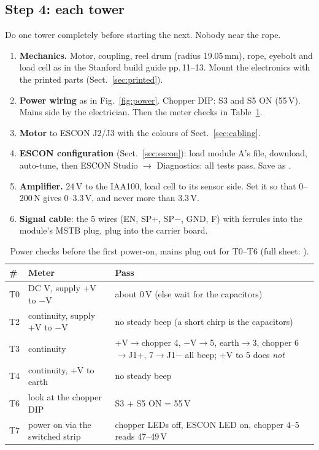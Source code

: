 \subsection{Step 4: each tower}
Do one tower completely before starting the next. Nobody near the rope.
\begin{enumerate}
\item \textbf{Mechanics.} Motor, coupling, reel drum (radius 19.05\,mm), rope, eyebolt and load cell as in the
Stanford build guide pp.\,11--13. Mount the electronics with the printed parts (Sect.~\ref{sec:printed}).
\item \textbf{Power wiring} as in Fig.~\ref{fig:power}. Chopper DIP: S3 and S5 ON (55\,V). Mains side by the
electrician. Then the meter checks in Table~\ref{tab:powerchecks}.
\item \textbf{Motor} to ESCON J2/J3 with the colours of Sect.~\ref{sec:cabling}.
\item \textbf{ESCON configuration} (Sect.~\ref{sec:escon}): load module A's file, download, auto-tune, then
ESCON Studio $\rightarrow$ Diagnostics: all tests pass. Save as .
\item \textbf{Amplifier.} 24\,V to the IAA100, load cell to its sensor side. Set it so that 0--200\,N gives
0--3.3\,V, and never more than 3.3\,V. 
\item \textbf{Signal cable}: the 5 wires (EN, SP+, SP$-$, GND, F) with ferrules into the module's MSTB plug,
plug into the carrier board.
\end{enumerate}

\begin{table}[H]\centering\small
\begin{tabularx}{\linewidth}{llX}
\toprule
\# & Meter & Pass \\
\midrule
T0 & DC V, supply +V to $-$V & about 0\,V (else wait for the capacitors) \\
T2 & continuity, supply +V to $-$V & no steady beep (a short chirp is the capacitors) \\
T3 & continuity & +V$\rightarrow$chopper 4, $-$V$\rightarrow$5, earth$\rightarrow$3, chopper 6$\rightarrow$J1+, 7$\rightarrow$J1$-$ all beep; +V to 5 does \emph{not} \\
T4 & continuity, +V to earth & no steady beep \\
T6 & look at the chopper DIP & S3 + S5 ON = 55\,V \\
T7 & power on via the switched strip & chopper LEDs off, ESCON LED on, chopper 4--5 reads 47--49\,V \\
\bottomrule
\end{tabularx}
\caption{Power checks before the first power-on, mains plug out for T0--T6 (full sheet:
).}
\label{tab:powerchecks}
\end{table}

